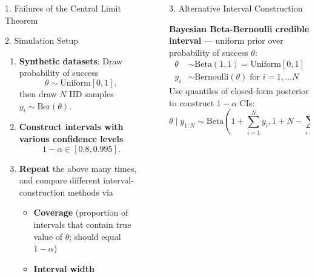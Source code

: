 \documentclass[final]{beamer}
\newlength{\sepwidth}
\newlength{\colwidth}
\newcommand{\separatorcolumn}{\begin{column}{\sepwidth}\end{column}}
\begin{document}
\begin{frame}[fragile]
\begin{columns}[t]
\begin{column}{\colwidth}
\begin{exampleblock}{1. Failures of the Central Limit Theorem}
  \end{exampleblock}

  \begin{exampleblock}{2. Simulation Setup}

    \begin{enumerate}
      \item \textbf{Synthetic datasets}: Draw probability of success 
      $$\theta \sim \text{Uniform}[0, 1],$$
      then draw $N$ IID samples 
      $y_i \sim \text{Ber}(\theta).$%
      \item \textbf{Construct intervals with various confidence levels} 
      $$1-\alpha \in [0.8, 0.995].$$
      \item \textbf{Repeat} the above many times, and compare different interval-construction methods via
        \begin{itemize}
          \Large
          \item \textbf{Coverage} (proportion of intervals that contain true value of $\theta$; should equal $1-\alpha$)
          \item \textbf{Interval width}
        \end{itemize}
    \end{enumerate}




  \end{exampleblock}

\end{column}

\separatorcolumn

\begin{column}{\colwidth}

  \begin{block}{3. Alternative Interval Construction}

    \textbf{Bayesian Beta-Bernoulli credible interval} --- uniform prior over probability of success $\theta$:
    $$
    \begin{aligned}
      \theta &\sim \text{Beta}(1, 1) = \text{Uniform}[0, 1] \\
      y_i &\sim \text{Bernoulli}(\theta) \; \text{for } i=1,\dots N 
    \end{aligned}
    $$
    Use quantiles of closed-form posterior to construct $1-\alpha$ CIs:
    $$
    \theta \mid y_{1:N} \sim \text{Beta}\left(1 + \sum_{i=1}^N y_i, 1 + N - \sum_{i=1}^N y_i\right)
    $$


\end{block}
\end{column}
\end{columns}
\end{frame}
\end{document}
